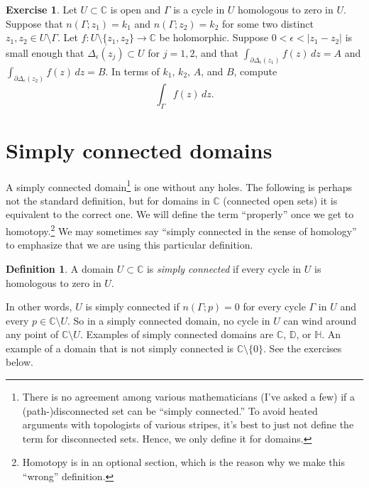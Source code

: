 \documentclass[12pt,openany]{book}
\newcommand{\sabs}[1]{\lvert {#1} \rvert}
\newcommand{\C}{{\mathbb{C}}}
\newcommand{\D}{{\mathbb{D}}}
\newcommand{\bH}{{\mathbb{H}}}
\newcommand{\myindex}[1]{#1\index{#1}}
\newcommand{\myquote}[1]{``#1''}
\theoremstyle{plain}
\theoremstyle{remark}
\theoremstyle{definition}
\newtheorem{defn}[thm]{Definition}
\newenvironment{exbox}{%
    \def\FrameCommand{\vrule width 1pt \relax\hspace{10pt}}%
    \MakeFramed{\advance\hsize-\width\FrameRestore}%
}{%
    \endMakeFramed
}
\theoremstyle{exercise}
\newtheorem{exercise}{Exercise}[section]
\theoremstyle{example}
\begin{document}
\begin{exbox}
\begin{exercise}
Let $U \subset \C$ is open and $\Gamma$ is a cycle in $U$
homologous to zero in $U$.
Suppose that $n(\Gamma;z_1) = k_1$ and  $n(\Gamma;z_2) = k_2$ for
some two distinct $z_1,z_2 \in U \setminus \Gamma$.
Let $f \colon U \setminus \{z_1,z_2\} \to \C$ be
holomorphic.
Suppose $0< \epsilon < \sabs{z_1-z_2}$ is small enough that
$\overline{\Delta_\epsilon(z_j)} \subset U$ for $j=1,2$,
and that
$\int_{\partial \Delta_\epsilon(z_1)} f(z) \, dz = A$ and 
$\int_{\partial \Delta_\epsilon(z_2)} f(z) \, dz = B$.
In terms of $k_1$, $k_2$, $A$, and $B$,
compute
\begin{equation*}
\int_{\Gamma} f(z) \, dz .
\end{equation*}
\end{exercise}
\end{exbox}



\section{Simply connected domains}

A simply connected domain\footnote{%
There is no agreement among various mathematicians (I've asked a few) if
a (path-)disconnected set can be \myquote{simply connected.}
To avoid heated arguments with topologists of various stripes,
it's best to just not define the term for disconnected sets.
Hence, we only define it for domains.}
is one without any holes.  The following is
perhaps not the standard definition, but for domains in $\C$
(connected open sets)
it is equivalent to the correct one.
We will define the term \myquote{properly} once we get 
to homotopy.\footnote{Homotopy is in an optional section, which is the
reason why we make this \myquote{wrong} definition.}
We may sometimes say
\myquote{simply connected in the sense of homology}
to emphasize that we are using this particular definition.

\begin{defn} \label{defn:simplyconnected:homology}
A domain $U \subset \C$ is \emph{\myindex{simply connected}}
if every cycle in $U$
is homologous to zero in $U$.
\end{defn}

In other words, $U$ is simply connected
if $n(\Gamma;p) = 0$ for every cycle $\Gamma$ in $U$ and
every $p \in \C \setminus U$.
So in a simply connected domain, no cycle in $U$ can wind around any point
of $\C \setminus U$.  Examples of simply connected domains are $\C$, $\D$, or
$\bH$.  An example of a domain that is not simply connected is
$\C \setminus \{ 0 \}$.
See the exercises below.
\end{document}
